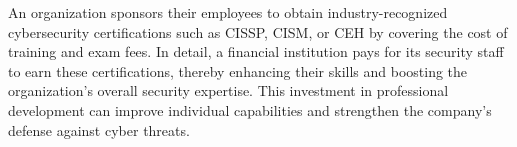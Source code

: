 An organization sponsors their employees to obtain industry-recognized cybersecurity certifications such as CISSP, CISM, or CEH by covering the cost of training and exam fees. In detail, a financial institution pays for its security staff to earn these certifications, thereby enhancing their skills and boosting the organization's overall security expertise. This investment in professional development can improve individual capabilities and strengthen the company's defense against cyber threats.